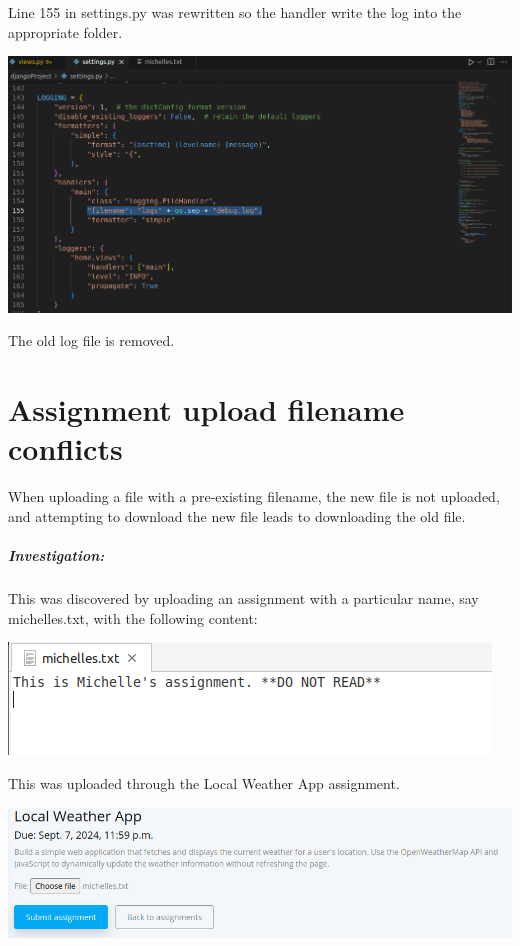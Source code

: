 Line 155 in settings.py was rewritten so the handler write the log into the appropriate folder.

\begin{center}
    \includegraphics[width = \linewidth]{images/Michelle/logfix.png}
\end{center}

The old log file is removed.

\section{Assignment upload filename conflicts}

When uploading a file with a pre-existing filename, the new file is not uploaded, and attempting to download the new file leads to downloading the old file.

\subparagraph{Investigation:}

This was discovered by uploading an assignment with a particular name, say michelles.txt, with the following content:

\begin{center}
    \includegraphics[width = \linewidth]{images/Michelle/michellestxt.png}
\end{center}

This was uploaded through the Local Weather App assignment.

\begin{center}
    \includegraphics[width = \linewidth]{images/Michelle/submitone.png}
\end{center}

